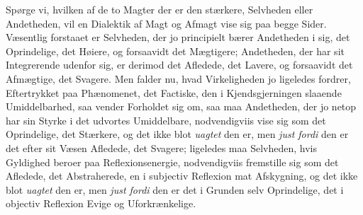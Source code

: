 \documentclass[11pt]{book}
\newcommand{\opage}[1]{\marginnote{\footnotesize\textit{[#1]}}}
\begin{document}
Spørge vi, hvilken af de to Magter der er den stærkere, Selvheden
eller Andetheden, vil en Dialektik af Magt og Afmagt vise sig paa
begge Sider. Væsentlig forstaaet er Selvheden, der jo principielt
bærer Andetheden i sig, det Oprindelige, det Høiere, og forsaavidt det
Mægtigere; Andetheden, der har
\opage{318} \setcounter{footnote}{0}%
sit Integrerende udenfor sig, er derimod det Afledede, det Lavere, og
forsaavidt det Afmægtige, det Svagere. Men falder nu, hvad
Virkeligheden jo ligeledes fordrer, Eftertrykket paa Phænomenet, det
Factiske, den i Kjendsgjerningen slaaende Umiddelbarhed, saa vender
Forholdet sig om, saa maa Andetheden, der jo netop har sin Styrke i
det udvortes Umiddelbare, nodvendigviis vise sig som det Oprindelige,
det Stærkere, og det ikke blot \emph{uagtet} den er, men \emph{just
fordi} den er det efter sit Væsen Afledede, det Svagere; ligeledes maa
Selvheden, hvis Gyldighed beroer paa Reflexionsenergie, nodvendigviis
fremstille sig som det Afledede, det Abstraherede, en i subjectiv
Reflexion mat Afskygning, og det ikke blot \emph{uagtet} den er, men
\emph{just fordi} den er det i Grunden selv Oprindelige, det i
objectiv Reflexion Evige og Uforkrænkelige.
\end{document}
